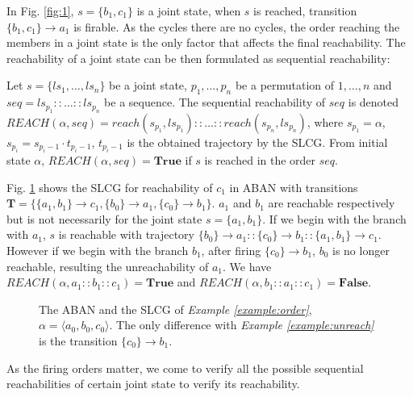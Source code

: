 \documentclass[runningheads]{llncs}
\newcommand{\acm}[3]{\{#1\}\rightarrow#3}
\newcommand{\ac}[3]{$\{#1\}\rightarrow#3$}
\begin{document}
In Fig. \ref{fig:1}, $s=\{ b_1,c_1\}$ is a joint state, when $s$ is reached, transition \ac{b_1,c_1}{a_0}{a_1} is firable.
As the cycles there are no cycles, the order reaching the members in a joint state is the only factor that affects the final reachability. 
The reachability of a joint state can be then formulated as sequential reachability:
\begin{definition}
Let $s=\{ls_1,\ldots,ls_n\}$ be a joint state, $p_1,\ldots ,p_n$ be a permutation of $1,\ldots ,n$ and $seq=ls_{p_1}::\ldots::ls_{p_n}$ be a sequence.
The sequential reachability of $seq$ is denoted %
$REACH(\alpha,seq)=reach(s_{p_1},ls_{p_1})::\ldots::reach(s_{p_n},ls_{p_n})$, where $s_{p_1}=\alpha$, $s_{p_i}=s_{p_i-1}\cdot t_{p_i-1}$, $t_{p_i-1}$ is the obtained trajectory by the SLCG.
From initial state $\alpha$, $REACH(\alpha,seq)=\mathbf{True}$ if $s$ is reached in the order $seq$.
\end{definition}

\begin{example}\label{example:order}
Fig. \ref{fig:5} shows the SLCG for reachability of $c_1$ in ABAN with transitions $\mathbf{T}=\{\acm{a_1,b_1}{c_0}{c_1},\acm{b_0}{a_0}{a_1},\acm{c_0}{b_0}{b_1}\}$.
$a_1$ and $b_1$ are reachable respectively but is not necessarily for the joint state $s=\{a_1,b_1\}$.
If we begin with the branch with $a_1$, $s$ is reachable with trajectory $\acm{b_0}{a_0}{a_1}::\acm{c_0}{b_0}{b_1}::\acm{a_1,b_1}{c_0}{c_1}$. 
However if we begin with the branch $b_1$, after firing $\acm{c_0}{b_0}{b_1}$, $b_0$ is no longer reachable, resulting the unreachability of $a_1$.
We have $REACH(\alpha,a_1::b_1::c_1)=\mathbf{True}$ and $REACH(\alpha,b_1::a_1::c_1)=\mathbf{False}$.
\end{example}
\begin{figure}[ht]
\centering

\caption{The ABAN and the SLCG of \textit{Example \ref{example:order}}, $\alpha=\langle a_0,b_0,c_0\rangle$. 
The only difference with \textit{Example \ref{example:unreach}} is the transition \ac{c_0}{b_0}{b_1}.
}
\label{fig:5}
\end{figure}



As the firing orders matter, we come to verify all the possible sequential reachabilities of certain joint state to verify its reachability.
\end{document}

